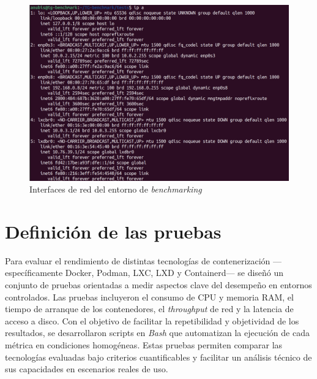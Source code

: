 \begin{figure}[H]
    \centering
    \includegraphics[width=\textwidth,height=0.85\textheight,keepaspectratio]{apendices/ENV-BENCH/interfaces.png}
    \caption{Interfaces de red del entorno de \textit{benchmarking}}\label{fig:INTERFACES-benchmarking}
\end{figure}

\section{Definición de las pruebas}
\noindent
Para evaluar el rendimiento de distintas tecnologías de contenerización —específicamente Docker, Podman, LXC, LXD y Containerd— se diseñó un conjunto de pruebas orientadas a medir aspectos clave del desempeño en entornos controlados. Las pruebas incluyeron el consumo de CPU y memoria RAM, el tiempo de arranque de los contenedores, el \textit{throughput} de red y la latencia de acceso a disco. 
Con el objetivo de facilitar la repetibilidad y objetividad de los resultados, se desarrollaron scripts en \textit{Bash} que automatizan la ejecución de cada métrica en condiciones homogéneas. Estas pruebas permiten comparar las tecnologías evaluadas bajo criterios cuantificables y facilitar un análisis técnico de sus capacidades en escenarios reales de uso.

